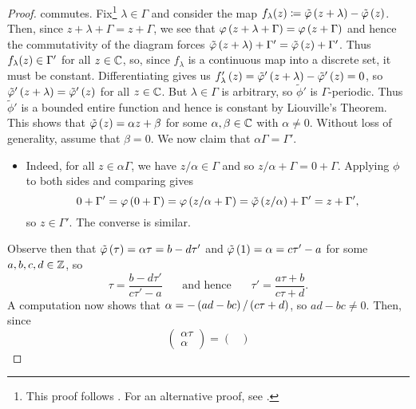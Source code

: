 \documentclass[../Moduli_Spaces_of_Riemann_Surfaces.tex]{subfiles}
\begin{document}
\begin{proof}
        commutes. Fix\footnote{This proof follows \cite[][Proposition 1.3.2]{diamond}. For an alternative proof, see \cite[][Lemma 2.8]{i&t}.} $\lambda\in\Gamma$ and consider the map $f_\lambda\!\left(z\right)\coloneqq\tilde{\varphi}\left(z+\lambda\right)-\tilde{\varphi}\left(z\right)$. Then, since $z+\lambda+\Gamma=z+\Gamma$, we see that $\varphi\left(z+\lambda+\Gamma\right)=\varphi\left(z+\Gamma\right)$ and hence the commutativity of the diagram forces $\tilde{\varphi}\left(z+\lambda\right)+\Gamma'=\tilde{\varphi}\left(z\right)+\Gamma'$. Thus $f_\lambda\!\left(z\right)\in\Gamma'$ for all $z\in\mathbb{C}$, so, since $f_\lambda$ is a continuous map into a discrete set, it must be constant. Differentiating gives us $f_\lambda'\left(z\right)=\tilde{\varphi}'\left(z+\lambda\right)-\tilde{\varphi}'\left(z\right)=0$, so $\tilde{\varphi}'\left(z+\lambda\right)=\tilde{\varphi}'\left(z\right)$ for all $z\in\mathbb{C}$. But $\lambda\in\Gamma$ is arbitrary, so $\tilde{\phi}'$ is $\Gamma$-periodic. Thus $\tilde{\phi}'$ is a bounded entire function and hence is constant by Liouville's Theorem. This shows that $\tilde{\varphi}\left(z\right)=\alpha z+\beta$ for some $\alpha,\beta\in\mathbb{C}$ with $\alpha\neq0$. Without loss of generality, assume that $\beta=0$. We now claim that $\alpha\Gamma=\Gamma'$.
        \begin{itemize}
            \item Indeed, for all $z\in\alpha\Gamma$, we have $z/\alpha\in\Gamma$ and so $z/\alpha+\Gamma=0+\Gamma$. Applying $\phi$ to both sides and comparing gives
                \begin{equation*}
                    0+\Gamma'=\varphi\left(0+\Gamma\right)=\varphi\left(z/\alpha+\Gamma\right)=\tilde{\varphi}\left(z/\alpha\right)+\Gamma'=z+\Gamma',
                \end{equation*}
                so $z\in\Gamma'$. The converse is similar.
        \end{itemize}
        Observe then that $\tilde{\varphi}\left(\tau\right)=\alpha\tau=b-d\tau'$ and $\tilde{\varphi}\left(1\right)=\alpha=c\tau'-a$ for some $a,b,c,d\in\mathbb{Z}$, so
        \begin{equation*}
            \tau=\frac{b-d\tau'}{c\tau'-a}\ \ \ \ \ \ \ \ \textrm{and hence}\ \ \ \ \ \ \ \ \tau'=\frac{a\tau+b}{c\tau+d}.
        \end{equation*}
        A computation now shows that $\alpha=-\left(ad-bc\right)/\left(c\tau+d\right)$, so $ad-bc\neq0$. Then, since
        \begin{equation*}
            \begin{pmatrix}
                \alpha\tau \\ \alpha
            \end{pmatrix}=
            \begin{pmatrix}

\end{pmatrix}
\end{equation*}
\end{proof}
\end{document}
